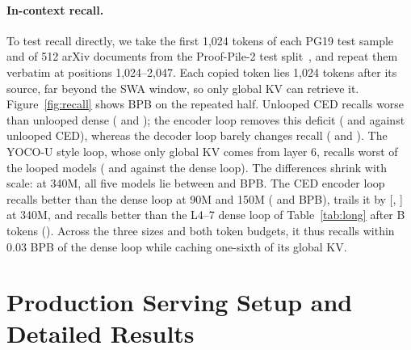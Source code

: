 \paragraph{In-context recall.}
\label{app:recall}
To test recall directly, we take the first 1,024 tokens of each PG19 test sample and of 512 arXiv documents from the Proof-Pile-2 test
split~\citep{llemma}, and repeat them verbatim at positions 1,024--2,047. Each copied token lies 1,024 tokens after its source, far beyond the SWA window, so only global KV can retrieve it.
Figure~\ref{fig:recall} shows BPB on the repeated half. Unlooped CED recalls
worse than unlooped dense ( and
); the encoder loop removes this deficit
( and  against
unlooped CED), whereas the decoder loop barely changes recall ( and
). The YOCO-U style loop, whose only global KV comes from layer 6,
recalls worst of the looped models ( and
 against the dense loop). The differences shrink with scale: at
340M, all five models lie between  and  BPB.
The CED encoder loop recalls better than the dense loop at 90M and 150M
( and  BPB), trails
it by  [,
] at 340M, and recalls better than the L4--7 dense loop of
Table~\ref{tab:long} after B tokens (). Across
the three sizes and both token budgets, it thus recalls within 0.03 BPB of the dense loop while caching one-sixth of its
global KV.


\section{Production Serving Setup and Detailed Results}
\label{app:serving}


